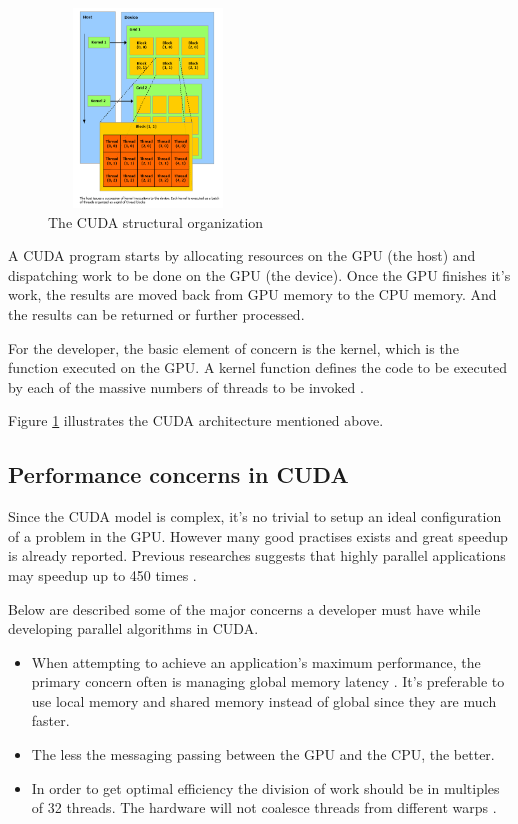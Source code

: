 \documentclass[conference]{IEEEtran}
\begin{document}
\begin{figure}[H]
    \begin{center}
    \includegraphics[width=200px,height=200px]{cudaModel}
    \end{center}
    \caption{The CUDA structural organization}
    \label{cuda-organization}
\end{figure}


A CUDA program starts by allocating resources on the GPU (the host)
and dispatching work to be done on the GPU (the device). Once the GPU
finishes it's work, the results are moved back from GPU memory to the
CPU memory. And the results can be returned or further processed.

For the developer, the basic element of concern is the kernel, which is
the function executed on the GPU. A kernel function defines the code
to be executed by each of the massive numbers of threads to be invoked
\cite{gpuOptimization}.

Figure \ref{cuda-organization} illustrates the CUDA architecture mentioned above.

\subsection{Performance concerns in CUDA}
Since the CUDA model is complex, it's no trivial to setup an ideal configuration 
of a problem in the GPU. However many good practises exists and great speedup is already
reported.  Previous researches suggests that highly parallel
applications may speedup up to 450 times \cite{gpuOptimization}.

Below are described some of the major concerns a developer must have
while developing parallel algorithms in CUDA.

\begin{itemize}
    \item When attempting to achieve an application's maximum performance, the primary concern often is managing global memory latency \cite{gpuOptimization}. It's preferable to use local memory and shared memory instead of global since they are much faster.
    \item The less the messaging passing between the GPU and the CPU, the better.
    \item In order to get optimal efficiency the division of work should be in multiples of 32 threads. The hardware will not coalesce threads from different warps \cite{cuda_internals}.
\end{itemize}
\end{document}
